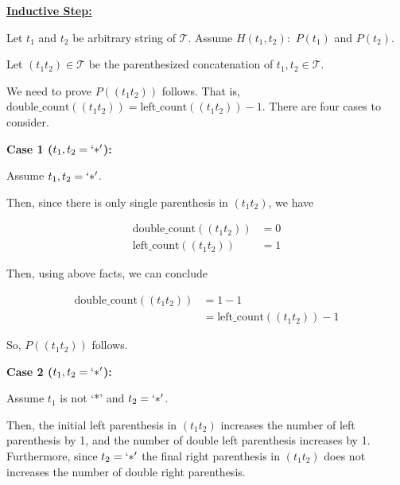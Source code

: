 \documentclass[12pt]{article}
\begin{document}
\begin{enumerate}[a.]
\begin{mdframed}
        \bigskip

        \underline{\textbf{Inductive Step:}}

        \bigskip

        Let $t_1$ and $t_2$ be arbitrary string of $\mathcal{T}$. Assume $H(t_1,t_2):$
        $P(t_1)$ and $P(t_2)$.

        \bigskip

        Let $(t_1t_2) \in \mathcal{T}$ be the parenthesized concatenation of $t_1,t_2 \in \mathcal{T}$.

        \bigskip

        We need to prove $P((t_1t_2))$ follows. That is, $\text{double\_count}((t_1t_2)) = \text{left\_count}((t_1t_2)) - 1$.
        There are four cases to consider.

        \bigskip

        \textbf{Case 1 ($t_1,t_2 = `*'$):}

        \bigskip

        Assume $t_1,t_2 = `*'$.

        \bigskip

        Then, \color{red}since there is only single parenthesis in $(t_1t_2)$,
        we have\color{black}

        \setcounter{equation}{0}
        \begin{align}
            \text{double\_count}((t_1t_2)) &= 0\\
            \text{left\_count}((t_1t_2)) &= 1
        \end{align}

        \bigskip

        Then, using above facts, we can conclude

        \begin{align}
            \text{double\_count}((t_1t_2)) &= 1 - 1\\
            &= \text{left\_count}((t_1t_2)) - 1
        \end{align}

        \bigskip

        So, $P((t_1t_2))$ follows.

        \bigskip

        \textbf{Case 2 ($t_1,t_2 = `*'$):}

        \bigskip

        Assume $t_1$ is not `*' and $t_2 = `*'$.

        \bigskip

        \color{red}Then, the initial left parenthesis in $(t_1t_2)$ increases
        the number of left parenthesis by 1, and the number of double left parenthesis
        increases by 1. Furthermore, since $t_2 = `*'$ the final right parenthesis in $(t_1t_2)$
        does not increases the number of double right parenthesis.


\end{mdframed}
\end{enumerate}
\end{document}
